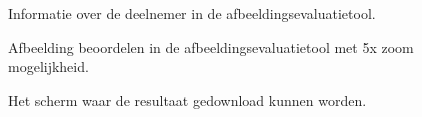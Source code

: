\FloatBarrier
\begin{figure}[h!]
	\caption{Informatie over de deelnemer in de \gls{afbeeldingsevaluatietool}.}
	\label{fig:bijlages-screenshot-afbeeldingsevaluatietool-over-u}
\end{figure}
\FloatBarrier

\FloatBarrier
\begin{figure}[h!]
	\caption{Afbeelding beoordelen in de \gls{afbeeldingsevaluatietool} met 5x zoom mogelijkheid.}
	\label{fig:bijlages-screenshot-afbeeldingsevaluatietool-evalutie}
\end{figure}
\FloatBarrier

\FloatBarrier
\begin{figure}[h!]
	\caption{Het scherm waar de resultaat gedownload kunnen worden.}
	\label{fig:bijlages-screenshot-afbeeldingsevaluatietool-export}
\end{figure}
\FloatBarrier